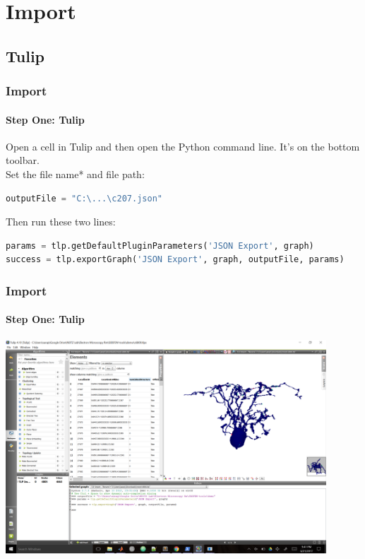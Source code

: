 \documentclass[11pt]{beamer}
\begin{document}
\section{Import}
\subsection{Tulip}
\begin{frame}[fragile]
	\frametitle{Import}
	\framesubtitle{Step One: Tulip}
	\begin{block}{}
		Open a cell in Tulip and then open the Python command line. It's on the bottom toolbar.\\
		Set the file name* and file path:
		\begin{lstlisting}[language=python]
outputFile = "C:\...\c207.json"\end{lstlisting}
		Then run these two lines:
		\begin{lstlisting}[language=python]
params = tlp.getDefaultPluginParameters('JSON Export', graph)
success = tlp.exportGraph('JSON Export', graph, outputFile, params)\end{lstlisting}
	\end{block}
\end{frame}

\begin{frame}
	\frametitle{Import}
	\framesubtitle{Step One: Tulip}
	\includegraphics[width = 0.9\textwidth]{tulip_python}
\end{frame}
\end{document}
